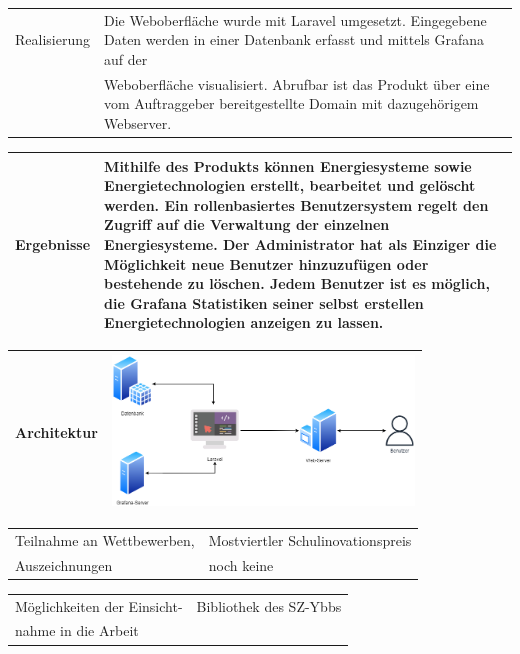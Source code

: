 \begin{tabular}{|p{\feldC}|p{\feldD}|}
 \hline
 Realisierung & Die Weboberfläche wurde mit Laravel umgesetzt. Eingegebene Daten werden in einer Datenbank erfasst und mittels Grafana auf der \\&Weboberfläche visualisiert. Abrufbar ist das Produkt über eine vom Auftraggeber bereitgestellte Domain mit dazugehörigem Webserver.  \\
 \hline
\end{tabular}

\begin{tabular}{|p{\feldC}|p{\feldD}|}
 \hline
 Ergebnisse &  Mithilfe des Produkts können Energiesysteme sowie Energietechnologien erstellt, bearbeitet und gelöscht werden. Ein rollenbasiertes Benutzersystem regelt den Zugriff auf die Verwaltung der einzelnen Energiesysteme. Der Administrator hat als Einziger die Möglichkeit neue Benutzer hinzuzufügen oder bestehende zu löschen. Jedem Benutzer ist es möglich, die Grafana Statistiken seiner selbst erstellen Energietechnologien anzeigen zu lassen.\\
 \hline
\end{tabular}

\begin{tabular}{|p{\feldC}|p{\feldD}|}
 \hline
 Architektur &   \includegraphics[height=4cm]{images/Architektur}\\ 
 
 
 \hline
\end{tabular}


\begin{tabular}{|p{\feldC}|p{\feldD}|}
 \hline
 Teilnahme an Wettbewerben, & Mostviertler Schulinovationspreis \\
 Auszeichnungen & noch keine\\
 \hline
\end{tabular}

\begin{tabular}{|p{\feldC}|p{\feldD}|}
 \hline
 Möglichkeiten der Einsicht- & Bibliothek des SZ-Ybbs \\
 nahme in die Arbeit & \\
 \hline
\end{tabular}

